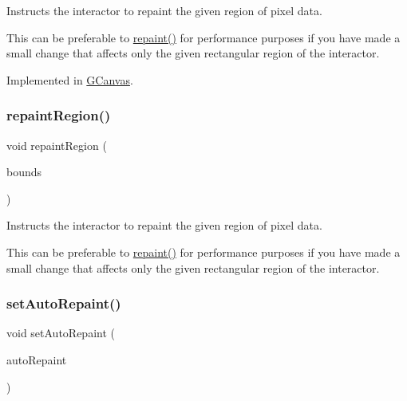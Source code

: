 Instructs the interactor to repaint the given region of pixel data. 

This can be preferable to \mbox{\hyperlink{classGDrawingSurface_a4a8ae47b42f1e6a41b65d3546df46218}{repaint()}} for performance purposes if you have made a small change that affects only the given rectangular region of the interactor. 

Implemented in \mbox{\hyperlink{classGCanvas_a63af8fca5bf186367132ecf6af6f5eea}{G\+Canvas}}.

\mbox{\label{classGDrawingSurface_a769c46fb3e1004aec76e8b0adfa42aa6}} 
\subsubsection{\texorpdfstring{repaint\+Region()}{repaintRegion()}\hspace{0.1cm}{\footnotesize\ttfamily [2/2]}}
{\footnotesize\ttfamily void repaint\+Region (\begin{DoxyParamCaption}\item[{const \mbox{\hyperlink{structGRectangle}{G\+Rectangle}} \&}]{bounds }\end{DoxyParamCaption})\hspace{0.3cm}{\ttfamily [virtual]}}



Instructs the interactor to repaint the given region of pixel data. 

This can be preferable to \mbox{\hyperlink{classGDrawingSurface_a4a8ae47b42f1e6a41b65d3546df46218}{repaint()}} for performance purposes if you have made a small change that affects only the given rectangular region of the interactor. \mbox{\label{classGDrawingSurface_adf10848319457bd6df4c657bf8872bee}} 
\subsubsection{\texorpdfstring{set\+Auto\+Repaint()}{setAutoRepaint()}}
{\footnotesize\ttfamily void set\+Auto\+Repaint (\begin{DoxyParamCaption}\item[{bool}]{auto\+Repaint }\end{DoxyParamCaption})\hspace{0.3cm}{\ttfamily [virtual]}}



